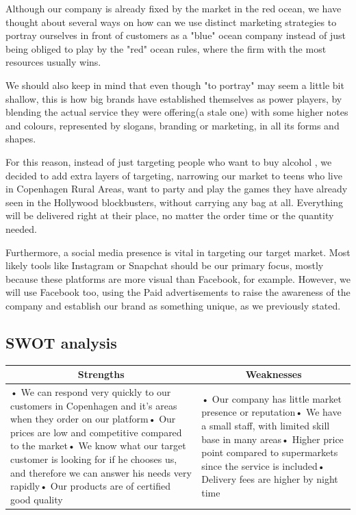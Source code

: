 \documentclass[12p]{article}
\begin{document}
Although our company is already fixed by the market in the red ocean, we have thought about several ways on how can we use distinct marketing strategies to portray ourselves in front of customers as a "blue" ocean company instead of just being obliged to play by the "red" ocean rules, where the firm with the most resources usually wins.

We should also keep in mind that even though "to portray" may seem a little bit shallow, this is how big brands have established themselves as power players, by blending the actual service they were offering(a stale one) with some higher notes and colours, represented by slogans, branding or marketing, in all its forms and shapes. 

For this reason, instead of just targeting people who want to buy alcohol , we decided to add extra layers of targeting, narrowing our market to teens who live in Copenhagen Rural Areas, want to party and play the games they have already seen in the Hollywood blockbusters, without carrying any bag at all. Everything will be delivered right at their place, no matter the order time or the quantity needed.

Furthermore, a social media presence is vital in targeting our target market. Most likely tools like Instagram or Snapchat should be our primary focus, mostly because these platforms are more visual than Facebook, for example. However, we will use Facebook too, using the Paid advertisements to raise the awareness of the company and establish our brand as something unique, as we previously stated. 


\subsection{SWOT analysis} \label{SWOT}

\begin{table}[htbp]
  \centering
    \begin{tabular}{|p{}|p{}|}
    \hline
    \multicolumn{1}{|c|}{\textbf{Strengths}} & \multicolumn{1}{c|}{\textbf{Weaknesses}} \\
    \hline
    {• We can respond very quickly to our customers in Copenhagen and it's areas when they order on our platform\newline{}• Our prices are low and competitive compared to the market\newline{}• We know what our target customer is looking for if he chooses us, and therefore we can answer his needs very rapidly\newline{}• Our products are of certified good quality} & • Our company has little market presence or reputation\newline{}• We have a small staff, with limited skill base in many areas\newline{}• Higher price point compared to supermarkets since the service is included\newline{}• Delivery fees are higher by night time \\
    \hline
    \end{tabular}
  \label{tab:swot_one}
\end{table}
\end{document}
